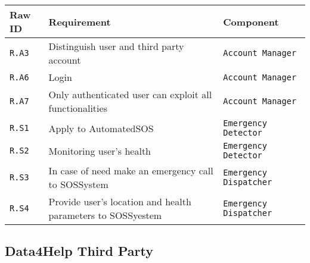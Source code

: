 \documentclass[../DD0.tex]{subfiles}
\begin{document}
    \begin{table}[h!]
      \centering
      \begin{tabularx}{.8\linewidth}{|X|X|X|}
        \hline
        \textbf{Raw ID} & \textbf{Requirement} & \textbf{Component} \\ \hline
        \texttt{R.A3} & Distinguish user and third party account & \texttt{Account Manager} \\
        \hline
        \texttt{R.A6} & Login & \texttt{Account Manager} \\
        \hline
       \texttt{R.A7} & Only authenticated user can exploit all functionalities & \texttt{Account Manager} \\
        \hline
        \texttt{R.S1}  & Apply to AutomatedSOS & \texttt{Emergency Detector} \\
        \hline
        \texttt{R.S2}  & Monitoring user's health & \texttt{Emergency Detector} \\
        \hline
        \texttt{R.S3}  & In case of need make an emergency call to SOSSystem & \texttt{Emergency Dispatcher} \\
        \hline
        \texttt{R.S4}  & Provide user's location and health parameters to SOSSyestem & \texttt{Emergency Dispatcher} \\
        \hline
      \end{tabularx}
      \label{tab:auto}
    \end{table}

\subsection{Data4Help Third Party}
\end{document}
